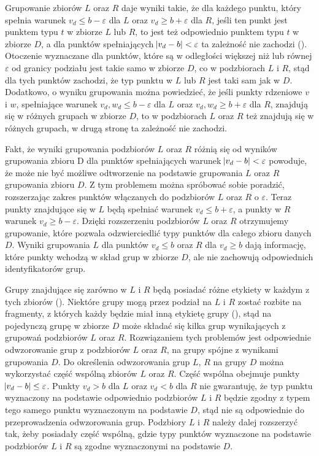 Grupowanie zbiorów $ L $ oraz $ R $ daje wyniki takie, że dla każdego punktu, który spełnia warunek $ v_d \le b - \varepsilon $ dla $ L $ oraz $ v_d \ge b + \varepsilon $ dla $ R $, jeśli ten punkt jest punktem typu $ t $ w zbiorze $ L $ lub $ R $, to jest też odpowiednio punktem typu $ t $ w zbiorze $ D $, a dla punktów spełniających $ \abs{v_d - b} < \varepsilon  $ ta zależność nie zachodzi (). Otoczenie wyznaczane dla punktów, które są w odległości większej niż lub równej $ \varepsilon $ od granicy podziału jest takie samo w zbiorze $ D $, co w podzbiorach $ L $ i $ R $, stąd dla tych punktów zachodzi, że typ punktu w $ L $ lub $ R $ jest taki sam jak w $ D $. Dodatkowo, o wyniku grupowania można powiedzieć, że jeśli punkty rdzeniowe $ v $ i $ w $, spełniające  warunek $ v_d, w_d \le b - \varepsilon $ dla $ L $ oraz $ v_d, w_d \ge b + \varepsilon $ dla $ R $, znajdują się w różnych grupach w zbiorze $ D $, to w podzbiorach $ L $ oraz $ R $ też znajdują się w różnych grupach, w drugą stronę ta zależność nie zachodzi.\par
Fakt, że wyniki grupowania podzbiorów $ L $ oraz $ R $ różnią się od wyników grupowania zbioru D dla punktów spełniających warunek $ \abs{v_d-b} < \varepsilon $ powoduje, że może nie być możliwe odtworzenie na podstawie grupowania $ L $ oraz $ R $ grupowania zbioru $ D $. Z tym problemem można spróbować sobie poradzić, rozszerzając zakres punktów włączanych do podzbiorów $ L $ oraz $ R $ o $ \varepsilon $. Teraz punkty znajdujące się w $ L $ będą spełniać warunek $ v_d \le b + \varepsilon $, a punkty w $ R $ warunek $ v_d \ge b - \varepsilon $. Dzięki rozszerzeniu podzbiorów $ L $ oraz $ R $ otrzymujemy grupowanie, które pozwala odzwierciedlić typy punktów dla całego zbioru danych $ D $. Wyniki grupowania $ L $ dla punktów $ v_d \le b $ oraz $ R $ dla $ v_d \ge b $ dają informację, które punkty wchodzą w skład grup w zbiorze $ D $, ale nie zachowują odpowiednich identyfikatorów grup.\par
Grupy znajdujące się zarówno w $ L $ i $ R $ będą posiadać różne etykiety w każdym z tych zbiorów (). Niektóre grupy mogą przez podział na $ L $ i $ R $ zostać rozbite na fragmenty, z których każdy będzie miał inną etykietę grupy (), stąd na pojedynczą grupę w zbiorze $ D $ może składać się kilka grup wynikających z grupowań podzbiorów $ L $ oraz $ R $. Rozwiązaniem tych problemów jest odpowiednie odwzorowanie grup z podzbiorów $ L $ oraz $ R $, na grupy spójne z wynikami grupowania $ D $. Do określenia odwzorowania grup $ L $, $ R $ na grupy $ D $ można wykorzystać część wspólną zbiorów $ L $ oraz $ R $. Część wspólna obejmuje punkty $ \abs{v_d - b} \le \varepsilon $. Punkty $ v_d > b $ dla $ L $ oraz $ v_d < b $ dla $ R $ nie gwarantuję, że typ punktu wyznaczony na podstawie odpowiednio podzbiorów $ L $ i $ R $ będzie zgodny z typem tego samego punktu wyznaczonym na podstawie $ D $, stąd nie są odpowiednie do przeprowadzenia odwzorowania grup. Podzbiory $ L $ i $ R $ należy dalej rozszerzyć tak, żeby posiadały część wspólną, gdzie typy punktów wyznaczone na podstawie podzbiorów $ L $ i $ R $ są zgodne wyznaczonymi na podstawie $ D $.

